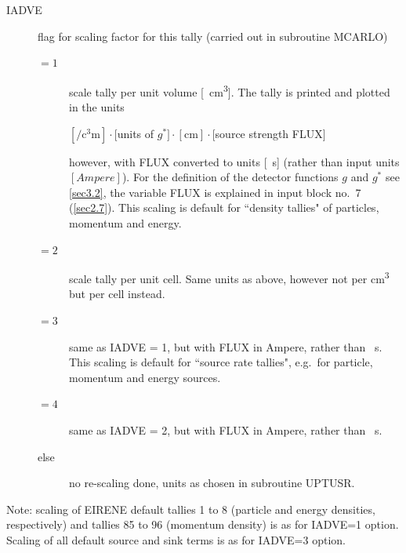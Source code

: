 \begin{description}
  \item[IADVE] flag for scaling factor for this tally
        (carried out in subroutine MCARLO)
        \begin{description}
          \item[$= 1$] scale tally
                per unit volume [\si{\per\cubic\centi\metre}].
                The tally is printed and plotted in the units

                $[\si{\per\cubic\centi\metre}] \cdot [$units of $g^*] \cdot [\si{\centi\metre}]
                  \cdot [$source strength FLUX$]$

                however, with FLUX converted to units [\si{\per\second}] (rather than input
                units $[Ampere]$).
                For the definition of the detector functions $g$ and $g^*$ see \cref{sec3.2},
                the variable FLUX is explained in input block no.\ 7 (\cref{sec2.7}).
                This scaling is default for ``density tallies" of particles, momentum and
                energy.
          \item[$= 2$] scale tally per unit cell.
                Same units as above, however not per \si{\cubic\centi\metre} but per cell
                instead.
          \item[$= 3$] same as IADVE = 1, but with FLUX in Ampere, rather than
                \si{\per\second}.
                This scaling is default for ``source rate tallies", e.g.\ for particle,
                momentum and energy sources.
          \item[$= 4$] same as IADVE = 2, but with FLUX in Ampere, rather than
                \si{\per\second}.
          \item[else] no re-scaling done, units as chosen in subroutine UPTUSR.
        \end{description}
\end{description}
Note: scaling of EIRENE default tallies 1 to 8 (particle and energy densities,
respectively) and tallies 85 to 96 (momentum density) is as for IADVE=1 option.
Scaling of all default source and sink terms is as for IADVE=3 option.

